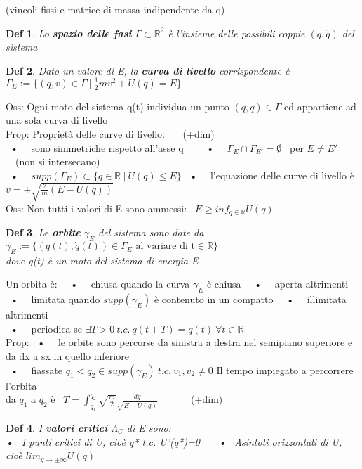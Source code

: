 \documentclass{article}
\theoremstyle{unnumbered}
\newtheorem* {theoremT}{Def}
\theoremstyle{unnumbered1}
\newenvironment{defi}{\begin{gBox}\begin{theoremT}}{\end{theoremT}\end{gBox}}
\begin{document}
(vincoli fissi e matrice di massa indipendente da q)
%
\begin{defi}
Lo \textbf{spazio delle fasi} $\Gamma \subset \mathbb{R}^2$ è l'insieme delle possibili coppie $(q,\dot{q})$ del sistema
\end{defi}
%
%
%
\begin{defi}
Dato un valore di E, la \textbf{curva di livello} corrispondente è \ \ $\Gamma_E:=\{(q,v)\in\Gamma \ | \ \frac{1}{2}mv^2 +U(q)=E\}$
\end{defi}
Oss: Ogni moto del sistema q(t) individua un punto $(q,\dot{q})\in\Gamma$ ed appartiene ad una sola curva di livello \\
Prop: Proprietà delle curve di livello: \ \ \ (+dim)\\
\ • \ \ sono simmetriche rispetto all'asse q \ \ \ 
\ • \ \ $\Gamma_E\cap\Gamma_{E'} = \emptyset$ \ per $E\neq E'$ \ \ (non si intersecano)\\
\ • \ \ $supp(\Gamma_E)\subset \{q\in\mathbb{R} \ |\ U(q) \leq E\}$ \hspace{0.3in}
\ • \ \ l'equazione delle curve di livello è $v=\pm\sqrt{\frac{2}{m}(E-U(q))}$ \\
Oss: Non tutti i valori di E sono ammessi: \ $E\ge inf_{q\in\mathbb{R}}U(q)$\\
%
%
%
\begin{defi}
Le \textbf{orbite} $\gamma_E$ del sistema sono date da $\gamma_E := \{(q(t),\dot{q}(t))\in\Gamma_E \text{ al variare di t} \in \mathbb{R}\}$\\
dove q(t) è un moto del sistema di energia E
\end{defi}
Un'orbita è: \
\ • \ \ chiusa quando la curva $\gamma_E$ è chiusa \
\ • \ \ aperta altrimenti \\
\ • \ \ limitata quando $supp(\gamma_E)$ è contenuto in un compatto \
\ • \ \ illimitata altrimenti\\
\ • \ \ periodica se $\exists T>0 \ t.c. \ q(t+T)=q(t) \ \forall t\in \mathbb{R} $ \\
Prop: \ • \ \ le orbite sono percorse da sinistra a destra nel semipiano superiore e da dx a sx in quello inferiore \\
\phantom{Prop: }\ • \ \ fiassate $q_1<q_2 \in supp(\gamma_E) \ t.c. \ v_1, v_2 \neq 0$ Il tempo impiegato a percorrere l'orbita\\
\phantom{Prop: \ • \ \ }da $q_1$ a $q_2$ è \ $T=\int_{q_1}^{q_2}\sqrt{\frac{m}{2}}\frac{dq}{\sqrt{E-U(q)}}$ \ \ \ \ \ \ (+dim) \\
%
%
\begin{defi}
I \textbf{valori critici} $\Lambda_C$ di E sono:\\
• \ I punti critici di U, cioè q* t.c. U'(q*)=0 \ \ \ • \ Asintoti orizzontali di U, cioè $lim_{q\rightarrow\pm\infty}U(q)$
\end{defi}
\end{document}
